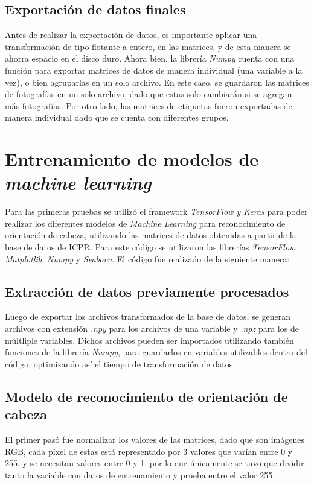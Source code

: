 \subsection{Exportación de datos finales}

Antes de realizar la exportación de datos, es importante aplicar una transformación de tipo flotante a entero, en las matrices, y de esta manera se ahorra espacio en el disco duro. Ahora bien, la librería \textit{Numpy} cuenta con una función para exportar matrices de datos de manera individual (una variable a la vez), o bien agruparlas en un solo archivo. En este caso, se guardaron las matrices de fotografías en un solo archivo, dado que estas solo cambiarán si se agregan más fotografías. Por otro lado, las matrices de etiquetas fueron exportadas de manera individual dado que se cuenta con diferentes grupos.

\section{Entrenamiento de modelos de \textit{machine learning}}
Para las primeras pruebas se utilizó el framework \textit{TensorFlow y Keras} para poder realizar los diferentes modelos de \textit{Machine Learning} para reconocimiento de orientación de cabeza, utilizando las matrices de datos obtenidas a partir de la base de datos de ICPR. Para este código se utilizaron las librerías \textit{TensorFlow}, \textit{Matplotlib}, \textit{Numpy} y \textit{Seaborn}. El código fue realizado de la siguiente manera:

\subsection{Extracción de datos previamente procesados}
Luego de exportar los archivos transformados de la base de datos, se generan archivos con extensión \textit{.npy} para los archivos de una variable y \textit{.npz} para los de múltliple variables. Dichos archivos pueden ser importados utilizando también funciones de la librería \textit{Numpy}, para guardarlos en variables utilizables dentro del código, optimizando así el tiempo de transformación de datos.

\subsection{Modelo de reconocimiento de orientación de cabeza}
El primer pasó fue normalizar los valores de las matrices, dado que son imágenes RGB, cada píxel de estas está representado por 3 valores que varían entre 0 y 255, y se necesitan valores entre 0 y 1, por lo que únicamente se tuvo que dividir tanto la variable con datos de entrenamiento y prueba entre el valor 255. 


